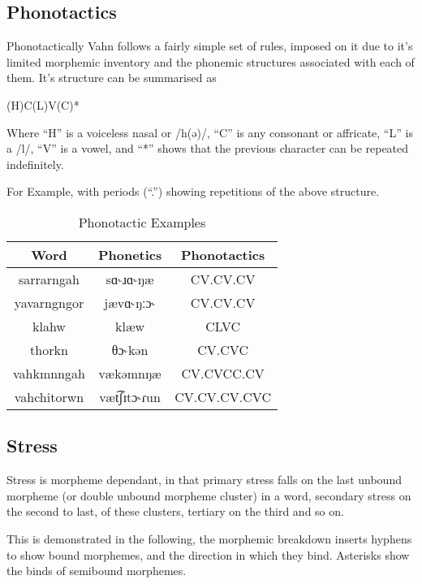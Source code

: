 \documentclass{article}
\begin{document}
\subsection{Phonotactics}

Phonotactically Vahn follows a fairly simple set of rules, imposed on it due to it's limited
morphemic inventory and the phonemic structures associated with each of them. It's structure can be
summarised as

\begin{center}
    (H)C(L)V(C)*
\end{center}

Where ``H'' is a voiceless nasal or /h(ə)/, ``C'' is any consonant or affricate, ``L'' is a /l/,
``V'' is a vowel, and ``*'' shows that the previous character can be repeated indefinitely.

For Example, with periods (``.'') showing repetitions of the above structure.

\begin{table}[H]
    \centering
    \begin{tabular}{c|c|c}
        Word & Phonetics & Phonotactics  \\
        \hline
        sarrarngah & sɑ˞ɹɑ˞ŋæ & CV.CV.CV \\
        yavarngngor & jævɑ˞ŋːɔ˞ & CV.CV.CV \\
        klahw & klæw & CLVC \\
        thorkn & θɔ˞kən & CV.CVC \\
        vahkmnngah & vækəmnŋæ & CV.CVCC.CV \\
        vahchitorwn & væt͡ʃɪtɔ˞ɾun & CV.CV.CV.CVC 
    \end{tabular}
    \caption{Phonotactic Examples}
    \label{Phonotactic Examples}
\end{table}

\subsection{Stress}

Stress is morpheme dependant, in that primary stress falls on the last unbound morpheme (or double
unbound morpheme cluster) in a word, secondary stress on the second to last, of these clusters,
tertiary on the third and so on.

This is demonstrated in the following, the morphemic breakdown inserts hyphens to show bound
morphemes, and the direction in which they bind. Asterisks show the binds of semibound morphemes.
\end{document}
